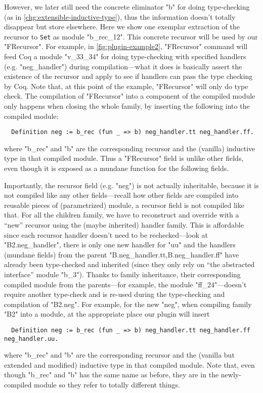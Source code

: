 However, we later still need the concrete eliminator "b" for doing type-checking (as in \ref{chg:extensible-inductive-type}), thus the information doesn't totally disappear but store elsewhere.  Here we show one exemplar extraction of the recursor to \texttt{Set} as module "b_rec_12". This concrete recursor will be used by our "FRecursor". For example, in \cref{fig:plugin-example2}, "FRecursor" command will feed Coq a module "v_33_34" for doing type-checking with specified handlers (e.g. "neg_handler") during compilation---what it does is basically
assert the existence of the recursor and apply to see if handlers can
pass the type checking by Coq. Note that, at this point of the example, "FRecursor" will only do type check. The compilation of "FRecursor" into a component of the compiled module only happens when closing the whole family, by inserting the following into the compiled module: 
\begin{verbatim}
  Definition neg := b_rec (fun _ => b) neg_handler.tt neg_handler.ff.
\end{verbatim}
where "b_rec" and "b" are the corresponding recursor and the (vanilla) inductive type in that compiled module. Thus a "FRecursor" field is unlike other fields, even though it is exposed as a mundane function for the following fields.

Importantly, the recursor field (e.g. "neg") is not actually inheritable, because it is not compiled like any other fields---recall how other fields are compiled into reusable pieces of (parametrized) module, a recursor field is not compiled like that. For all the children family, we have to reconstruct and override with a ``new'' recursor using the (maybe inherited) handler family. This is affordable since each recursor handler doesn't need
to be rechecked---look at "B2.neg_handler", there is only one new
handler for "uu" and the handlers (mundane fields) from the parent
"B.neg_handler.tt,B.neg_handler.ff" have already been type-checked and
inherited (since they only rely on ``the abstracted
interface'' module "b_3"). 
Thanks to family inheritance, their corresponding compiled module from the parents---for example, 
the module "ff_24"---doesn't require another type-check and is re-used during the type-checking and compilation of "B2.neg". For example, for the new "neg", when compiling family "B2" into a module, at the appropriate place our plugin will insert
\begin{verbatim}
  Definition neg := b_rec (fun _ => b) neg_handler.tt neg_handler.ff neg_handler.uu.
\end{verbatim}
where "b_rec" and "b" are the corresponding recursor and the (vanilla but extended and modified) inductive type in that compiled module. Note that, even though "b_rec" and "b" has the same name as before, they are in the newly-compiled module so they refer to totally different things. 





